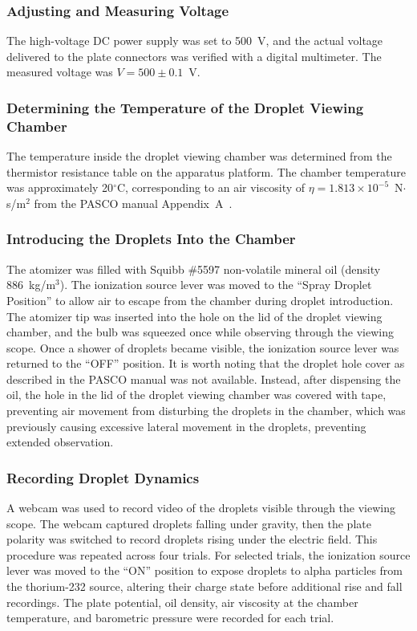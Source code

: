 \documentclass[%
 reprint,
 amsmath,amssymb,
 aps,
]{revtex4-2}
\begin{document}
\subsubsection{Adjusting and Measuring Voltage}
The high-voltage DC power supply was set to 500~V, and the actual voltage delivered to the plate connectors was verified with a digital multimeter. The measured voltage was $V = 500 \pm 0.1$~V.

\subsubsection{Determining the Temperature of the Droplet Viewing Chamber}
The temperature inside the droplet viewing chamber was determined from the thermistor resistance table on the apparatus platform. The chamber temperature was approximately 20$^\circ$C, corresponding to an air viscosity of $\eta = 1.813 \times 10^{-5}$~N$\cdot$s/m$^2$ from the PASCO manual Appendix~A~\cite{PASCO-AP8210A}.

\subsubsection{Introducing the Droplets Into the Chamber}
The atomizer was filled with Squibb \#5597 non-volatile mineral oil (density 886~kg/m$^3$). The ionization source lever was moved to the ``Spray Droplet Position'' to allow air to escape from the chamber during droplet introduction. The atomizer tip was inserted into the hole on the lid of the droplet viewing chamber, and the bulb was squeezed once while observing through the viewing scope. Once a shower of droplets became visible, the ionization source lever was returned to the ``OFF'' position. It is worth noting that the droplet hole cover as described in the PASCO manual was not available. Instead, after dispensing the oil, the hole in the lid of the droplet viewing chamber was covered with tape, preventing air movement from disturbing the droplets in the chamber, which was previously causing excessive lateral movement in the droplets, preventing extended observation.

\subsubsection{Recording Droplet Dynamics}
A webcam was used to record video of the droplets visible through the viewing scope. The webcam captured droplets falling under gravity, then the plate polarity was switched to record droplets rising under the electric field. This procedure was repeated across four trials. For selected trials, the ionization source lever was moved to the ``ON'' position to expose droplets to alpha particles from the thorium-232 source, altering their charge state before additional rise and fall recordings. The plate potential, oil density, air viscosity at the chamber temperature, and barometric pressure were recorded for each trial.
\end{document}
